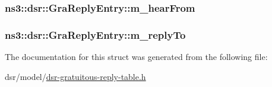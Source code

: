 \subsubsection[{\texorpdfstring{m\+\_\+hear\+From}{m_hearFrom}}]{ ns3\+::dsr\+::\+Gra\+Reply\+Entry\+::m\+\_\+hear\+From}\hypertarget{structns3_1_1dsr_1_1GraReplyEntry_addd9ad57b844e1140bbebf5dc5370e71}{}\label{structns3_1_1dsr_1_1GraReplyEntry_addd9ad57b844e1140bbebf5dc5370e71}
\subsubsection[{\texorpdfstring{m\+\_\+reply\+To}{m_replyTo}}]{ ns3\+::dsr\+::\+Gra\+Reply\+Entry\+::m\+\_\+reply\+To}\hypertarget{structns3_1_1dsr_1_1GraReplyEntry_a8c35d8cbe8774566a445f865e227e367}{}\label{structns3_1_1dsr_1_1GraReplyEntry_a8c35d8cbe8774566a445f865e227e367}


The documentation for this struct was generated from the following file\+:\begin{DoxyCompactItemize}
\item 
dsr/model/\hyperlink{dsr-gratuitous-reply-table_8h}{dsr-\/gratuitous-\/reply-\/table.\+h}\end{DoxyCompactItemize}
